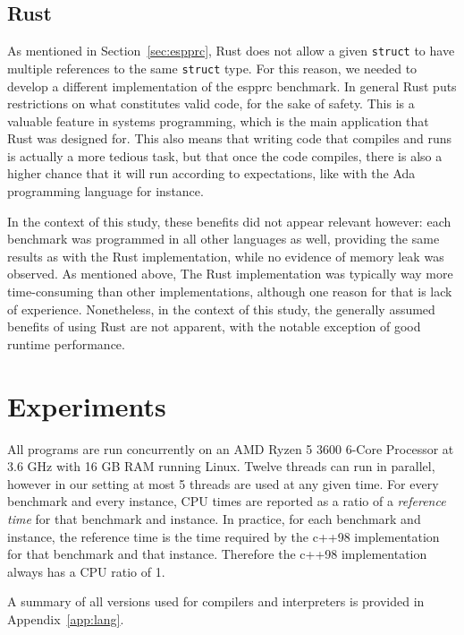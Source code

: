 \documentclass[11pt,a4paper,notitlepage]{article}
\begin{document}
\subsection{Rust}
As mentioned in Section~\ref{sec:espprc}, Rust does not allow a given
\verb|struct| to have multiple references to the same \verb|struct|
type. For this reason, we needed to develop a different implementation
of the espprc benchmark. In general Rust puts restrictions on what
constitutes valid code, for the sake of safety. This is a valuable
feature in systems programming, which is the main application that Rust was
designed for. This also means that writing code that compiles and runs
is actually a more tedious task, but that once the code compiles,
there is also a higher chance that it will run according to
expectations, like with the Ada programming language for instance.

In the context of this study, these benefits did not appear relevant
however: each benchmark was programmed in all other languages as well,
providing the same results as with the Rust implementation, while no
evidence of memory leak was observed. As mentioned above, The Rust
implementation was typically way more time-consuming than other
implementations, although one reason for that is lack of
experience. Nonetheless, in the context of this study, the generally
assumed benefits of using Rust are not apparent, with the notable
exception of good runtime performance.

\section{Experiments}
All programs are run concurrently on an AMD Ryzen 5 3600 6-Core
Processor at 3.6 GHz with 16 GB RAM running Linux. Twelve threads can
run in parallel, however in our setting at most 5 threads are used at
any given time. For every benchmark and every instance, CPU times are
reported as a ratio of a \emph{reference time} for that benchmark and
instance. In practice, for each benchmark and instance, the reference
time is the time required by the c++98 implementation for that
benchmark and that instance. Therefore the c++98 implementation always
has a CPU ratio of 1.

A summary of all versions used for compilers and interpreters is
provided in Appendix~\ref{app:lang}.
\end{document}
